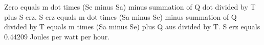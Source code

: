 Zero equals m dot times (Se minus Sa) minus summation of Q dot divided by T plus S erz.  
S erz equals m dot times (Sa minus Se) minus summation of Q divided by T equals m times (Sa minus Se) plus Q aus divided by T.  
S erz equals 0.44209 Joules per watt per hour.